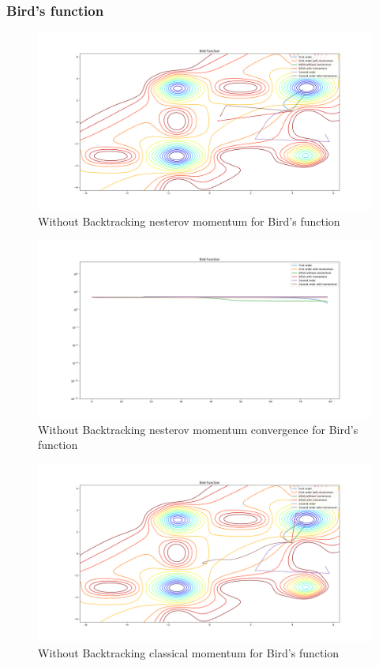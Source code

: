 \documentclass{article}
\begin{document}
\subsubsection{Bird's function}

\begin{figure}[H]
	\includegraphics[width=\linewidth]{../Images/birdnesterov.png}
	\caption{Without Backtracking nesterov momentum for Bird's function}
	\label{fig:Without Backtracking nesterov momentum for Bird's function}
\end{figure}

\begin{figure}[H]
	\includegraphics[width=\linewidth]{../Images/birdnesterov1.png}
	\caption{Without Backtracking nesterov momentum convergence for Bird's function}
	\label{fig:Without Backtracking nesterov momentum convergence for Bird's function}
\end{figure}

\begin{figure}[H]
	\includegraphics[width=\linewidth]{../Images/birdmomentum.png}
	\caption{Without Backtracking classical momentum for Bird's function}
	\label{fig:Without Backtracking classical momentum for Bird's function}
\end{figure}
\end{document}
